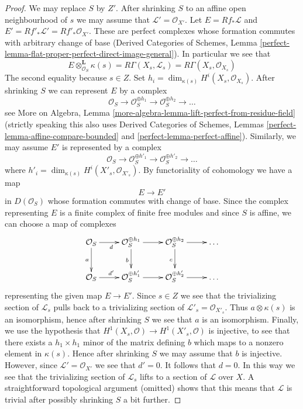 \documentclass[10pt,a4paper]{amsart}
\theoremstyle{plain}
\theoremstyle{definition}
\theoremstyle{remark}
\numberwithin{equation}{subsection}
\begin{document}
\begin{proof}
We may replace $S$ by $Z'$. After shrinking $S$ to an affine open neighbourhood
of $s$ we may assume that $\mathcal{L}' = \mathcal{O}_{X'}$.
Let $E = Rf_*\mathcal{L}$ and $E' = Rf'_*\mathcal{L}' = Rf'_*\mathcal{O}_{X'}$.
These are perfect complexes whose formation commutes with arbitrary
change of base (Derived Categories of Schemes, Lemma
\ref{perfect-lemma-flat-proper-perfect-direct-image-general}).
In particular we see that
$$
E \otimes_{\mathcal{O}_S}^\mathbf{L} \kappa(s) =
R\Gamma(X_s, \mathcal{L}_s) = R\Gamma(X_s, \mathcal{O}_{X_s})
$$
The second equality because $s \in Z$. Set
$h_i = \dim_{\kappa(s)} H^i(X_s, \mathcal{O}_{X_s})$.
After shrinking $S$ we can represent $E$ by a complex
$$
\mathcal{O}_S \to \mathcal{O}_S^{\oplus h_1} \to
\mathcal{O}_S^{\oplus h_2} \to \ldots
$$
see More on Algebra, Lemma
\ref{more-algebra-lemma-lift-perfect-from-residue-field}
(strictly speaking this also uses
Derived Categories of Schemes, Lemmas
\ref{perfect-lemma-affine-compare-bounded} and
\ref{perfect-lemma-perfect-affine}). Similarly, we may assume $E'$
is represented by a complex
$$
\mathcal{O}_S \to \mathcal{O}_S^{\oplus h'_1} \to
\mathcal{O}_S^{\oplus h'_2} \to \ldots
$$
where $h'_i = \dim_{\kappa(s)} H^i(X'_s, \mathcal{O}_{X'_s})$.
By functoriality of cohomology we have a map
$$
E \longrightarrow E'
$$
in $D(\mathcal{O}_S)$ whose formation commutes with change of base.
Since the complex representing $E$ is a finite complex of finite free
modules and since $S$ is affine, we can choose a map of complexes
$$
\xymatrix{
\mathcal{O}_S \ar[r]_d \ar[d]_a &
\mathcal{O}_S^{\oplus h_1} \ar[r] \ar[d]_b &
\mathcal{O}_S^{\oplus h_2} \ar[r] \ar[d]_c & \ldots \\
\mathcal{O}_S \ar[r]^{d'} &
\mathcal{O}_S^{\oplus h'_1} \ar[r] &
\mathcal{O}_S^{\oplus h'_2} \ar[r] & \ldots
}
$$
representing the given map $E \to E'$. Since $s \in Z$ we see that
the trivializing section of $\mathcal{L}_s$ pulls back to a trivializing
section of $\mathcal{L}'_s = \mathcal{O}_{X'_s}$. Thus
$a \otimes \kappa(s)$ is an isomorphism, hence after shrinking $S$
we see that $a$ is an isomorphism. Finally, we use the hypothesis
that $H^1(X_s, \mathcal{O}) \to H^1(X'_s, \mathcal{O})$
is injective, to see that there exists a $h_1 \times h_1$ minor of the
matrix defining $b$ which maps to a nonzero
element in $\kappa(s)$. Hence after shrinking $S$ we may assume
that $b$ is injective. However, since $\mathcal{L}' = \mathcal{O}_{X'}$
we see that $d' = 0$. It follows that $d = 0$. In this way we see
that the trivializing section of $\mathcal{L}_s$ lifts to a section
of $\mathcal{L}$ over $X$. A straightforward topological argument (omitted)
shows that this means that $\mathcal{L}$ is trivial after possibly
shrinking $S$ a bit further.
\end{proof}
\end{document}

